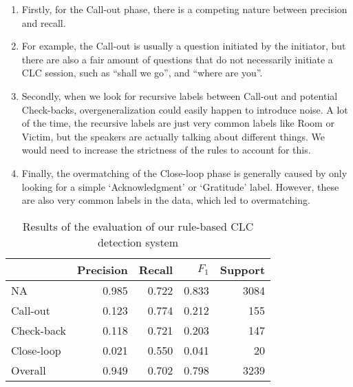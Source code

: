 \begin{enumerate}

    \item Firstly, for the Call-out phase,
there is a competing nature between precision and recall.

    \item For example, the Call-out is usually a question initiated by the
        initiator, but there are also a fair amount of questions that do not
        necessarily initiate a CLC session, such as ``shall we go'', and
        ``where are you''.

    \item Secondly, when we look for recursive labels between Call-out and
        potential Check-backs, overgeneralization could easily happen to
        introduce noise. A lot of the time, the recursive labels are just very
        common labels like Room or Victim, but the speakers are actually
        talking about different things. We would need to increase the
        strictness of the rules to account for this.

    \item Finally, the overmatching of the Close-loop phase is generally caused
        by only looking for a simple `Acknowledgment' or `Gratitude' label.
        However, these are also very common labels in the data, which led to
        overmatching.

\end{enumerate}



\begin{table}
    \centering
    \begin{tabular}{lrrrr}
        \toprule
                   & Precision & Recall & $F_1$ & Support\\\midrule
        NA         & 0.985     & 0.722  & 0.833 & 3084\\
        Call-out   & 0.123     & 0.774  & 0.212 & 155 \\
        Check-back & 0.118     & 0.721  & 0.203 & 147\\
        Close-loop & 0.021     & 0.550  & 0.041 & 20\\
        Overall    & 0.949     & 0.702  & 0.798 & 3239\\
        \bottomrule
    \end{tabular}
    \caption{Results of the evaluation of our rule-based CLC detection system}
    \label{tab:clc}
\end{table}

